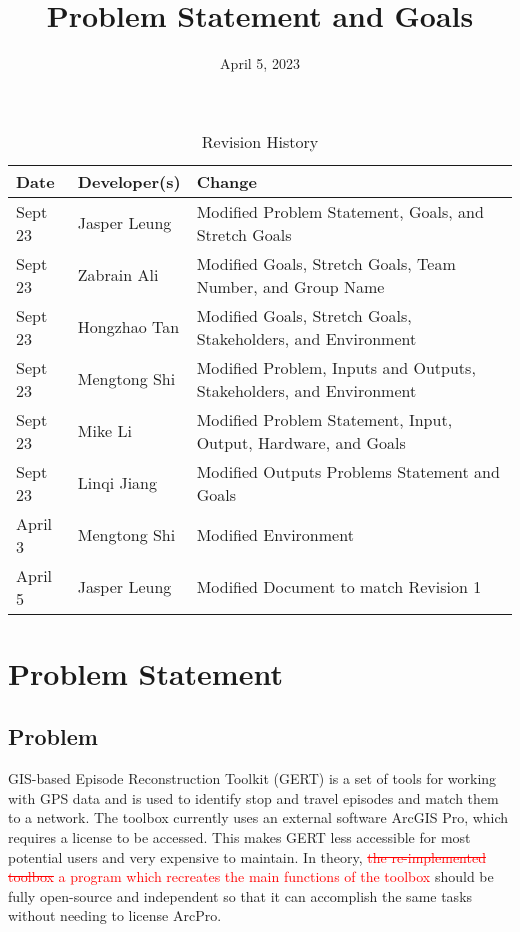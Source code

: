 \documentclass{article}
\title{Problem Statement and Goals\\\progname}
\author{\authname}
\date{April 5, 2023}
\begin{document}
\maketitle

\begin{table}[hp]
\caption{Revision History} \label{TblRevisionHistory}
\begin{tabularx}{\textwidth}{llX}
\toprule
\textbf{Date} & \textbf{Developer(s)} & \textbf{Change}\\
\midrule
Sept 23 & Jasper Leung & Modified Problem Statement, Goals, and Stretch Goals\\
Sept 23 & Zabrain Ali & Modified Goals, Stretch Goals, Team Number, and Group Name\\
Sept 23 & Hongzhao Tan & Modified Goals, Stretch Goals, Stakeholders, and Environment\\
Sept 23 & Mengtong Shi & Modified Problem, Inputs and Outputs, Stakeholders, and Environment\\
Sept 23 & Mike Li & Modified Problem Statement, Input, Output, Hardware, and Goals\\
Sept 23 & Linqi Jiang & Modified Outputs Problems Statement and Goals\\
April 3 & Mengtong Shi & Modified Environment\\
April 5 & Jasper Leung & Modified Document to match Revision 1\\
\bottomrule
\end{tabularx}
\end{table}

\section{Problem Statement}


\subsection{Problem}
GIS-based Episode Reconstruction Toolkit (GERT) is a set of tools for working with GPS data and is used to identify stop and travel episodes and  match them to a network. The toolbox currently uses an external software ArcGIS Pro, which requires a license to be accessed. This makes GERT less accessible for most potential users and very expensive to maintain. In theory, \textcolor{red}{\sout{the re-implemented toolbox} a program which recreates the main functions of the toolbox} should be fully open-source and independent so that it can accomplish the same tasks without needing to license ArcPro.
\end{document}
